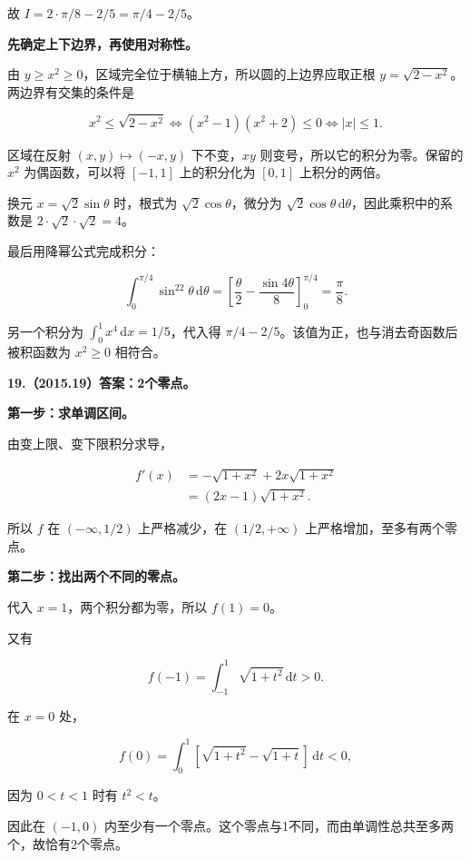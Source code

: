 \documentclass[UTF8,11pt,fontset=windows]{ctexart}
\begin{document}
故 $I=2\cdot\pi/8-2/5=\pi/4-2/5$。

\textbf{先确定上下边界，再使用对称性。}

由 $y\ge x^2\ge0$，区域完全位于横轴上方，所以圆的上边界应取正根 $y=\sqrt{2-x^2}$。两边界有交集的条件是

$$
x^2\le\sqrt{2-x^2}
\iff (x^2-1)(x^2+2)\le0
\iff |x|\le1.
$$

区域在反射 $(x,y)\mapsto(-x,y)$ 下不变，$xy$ 则变号，所以它的积分为零。保留的 $x^2$ 为偶函数，可以将 $[-1,1]$ 上的积分化为 $[0,1]$ 上积分的两倍。

换元 $x=\sqrt2\sin\theta$ 时，根式为 $\sqrt2\cos\theta$，微分为 $\sqrt2\cos\theta\,\mathrm d\theta$，因此乘积中的系数是 $2\cdot\sqrt2\cdot\sqrt2=4$。

最后用降幂公式完成积分：

$$
\int_0^{\pi/4}\sin^22\theta\,\mathrm d\theta
=\left[\frac\theta2-\frac{\sin4\theta}{8}\right]_0^{\pi/4}
=\frac\pi8.
$$

另一个积分为 $\int_0^1x^4\,\mathrm dx=1/5$，代入得 $\pi/4-2/5$。该值为正，也与消去奇函数后被积函数为 $x^2\ge0$ 相符合。

\clearpage

\textbf{19.（2015.19）答案：2个零点。}

\textbf{第一步：求单调区间。}

由变上限、变下限积分求导，

$$
\begin{aligned}
f'(x)&=-\sqrt{1+x^2}+2x\sqrt{1+x^2}\\
&=(2x-1)\sqrt{1+x^2}.
\end{aligned}
$$

所以 $f$ 在 $(-\infty,1/2)$ 上严格减少，在 $(1/2,+\infty)$ 上严格增加，至多有两个零点。

\textbf{第二步：找出两个不同的零点。}

代入 $x=1$，两个积分都为零，所以 $f(1)=0$。

又有

$$
f(-1)=\int_{-1}^1\sqrt{1+t^2}\,\mathrm dt>0.
$$

在 $x=0$ 处，

$$
f(0)=\int_0^1\left[\sqrt{1+t^2}-\sqrt{1+t}\right]\,\mathrm dt<0,
$$

因为 $0<t<1$ 时有 $t^2<t$。

因此在 $(-1,0)$ 内至少有一个零点。这个零点与1不同，而由单调性总共至多两个，故恰有2个零点。
\end{document}
